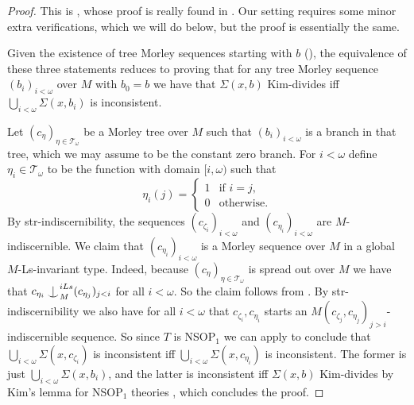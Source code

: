 \documentclass[a4paper, reqno]{amsart}
\theoremstyle{definition}
\theoremstyle{repeat}
\newcommand{\T}{\mathcal{T}}
\def\Ind#1#2{#1\setbox0=\hbox{$#1x$}\kern\wd0\hbox to 0pt{\hss$#1\mid$\hss}
\lower.9\ht0\hbox to 0pt{\hss$#1\smile$\hss}\kern\wd0}
\def\ind{\mathop{\mathpalette\Ind{}}}
\begin{document}
\begin{proof}
This is \cite[Corollary 5.14]{kaplan_kim-independence_2020}, whose proof is really found in \cite[Proposition 5.13]{kaplan_kim-independence_2020}. Our setting requires some minor extra verifications, which we will do below, but the proof is essentially the same.

Given the existence of tree Morley sequences starting with $b$ (), the equivalence of these three statements reduces to proving that for any tree Morley sequence $(b_i)_{i < \omega}$ over $M$ with $b_0 = b$ we have that $\Sigma(x, b)$ Kim-divides iff $\bigcup_{i < \omega} \Sigma(x, b_i)$ is inconsistent.

Let $(c_\eta)_{\eta \in \T_\omega}$ be a Morley tree over $M$ such that $(b_i)_{i < \omega}$ is a branch in that tree, which we may assume to be the constant zero branch. For $i < \omega$ define $\eta_i \in \T_\omega$ to be the function with domain $[i, \omega)$ such that
\[
\eta_i(j) = \begin{cases}
1 & \text{if } i = j,\\
0 & \text{otherwise}.
\end{cases}
\]
By str-indiscernibility, the sequences $(c_{\zeta_i})_{i < \omega}$ and $(c_{\eta_i})_{i < \omega}$ are $M$-indiscernible. We claim that $(c_{\eta_i})_{i < \omega}$ is a Morley sequence over $M$ in a global $M$-Ls-invariant type. Indeed, because $(c_\eta)_{\eta \in \T_\omega}$ is spread out over $M$ we have that $c_{\eta_i} \ind^{iLs}_M (c_{\eta_j})_{j < i}$ for all $i < \omega$. So the claim follows from . By str-indiscernibility we also have for all $i < \omega$ that $c_{\zeta_i}, c_{\eta_i}$ starts an $M (c_{\zeta_j}, c_{\eta_j})_{j > i}$-indiscernible sequence. So since $T$ is NSOP$_1$ we can apply \cite[Lemma 5.10]{dobrowolski_kim-independence_2022} to conclude that $\bigcup_{i < \omega} \Sigma(x, c_{\zeta_i})$ is inconsistent iff $\bigcup_{i < \omega} \Sigma(x, c_{\eta_i})$ is inconsistent. The former is just $\bigcup_{i < \omega} \Sigma(x, b_i)$, and the latter is inconsistent iff $\Sigma(x, b)$ Kim-divides by Kim's lemma for NSOP$_1$ theories \cite[Proposition 4.4]{dobrowolski_kim-independence_2022}, which concludes the proof.
\end{proof}
\end{document}
